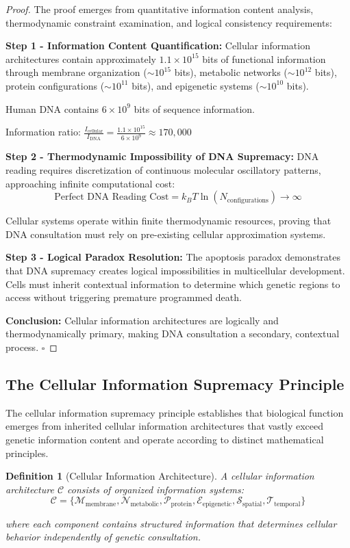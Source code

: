 \documentclass[12pt,a4paper]{article}
\newtheorem{definition}[theorem]{Definition}
\begin{document}
\begin{proof}
The proof emerges from quantitative information content analysis, thermodynamic constraint examination, and logical consistency requirements:

\textbf{Step 1 - Information Content Quantification:}
Cellular information architectures contain approximately $1.1 \times 10^{15}$ bits of functional information through membrane organization ($\sim 10^{15}$ bits), metabolic networks ($\sim 10^{12}$ bits), protein configurations ($\sim 10^{11}$ bits), and epigenetic systems ($\sim 10^{10}$ bits).

Human DNA contains $6 \times 10^9$ bits of sequence information.

Information ratio: $\frac{I_{\text{cellular}}}{I_{\text{DNA}}} = \frac{1.1 \times 10^{15}}{6 \times 10^9} \approx 170,000$

\textbf{Step 2 - Thermodynamic Impossibility of DNA Supremacy:}
DNA reading requires discretization of continuous molecular oscillatory patterns, approaching infinite computational cost:
$$\text{Perfect DNA Reading Cost} = k_B T \ln(N_{\text{configurations}}) \to \infty$$

Cellular systems operate within finite thermodynamic resources, proving that DNA consultation must rely on pre-existing cellular approximation systems.

\textbf{Step 3 - Logical Paradox Resolution:}
The apoptosis paradox demonstrates that DNA supremacy creates logical impossibilities in multicellular development. Cells must inherit contextual information to determine which genetic regions to access without triggering premature programmed death.

\textbf{Conclusion:} Cellular information architectures are logically and thermodynamically primary, making DNA consultation a secondary, contextual process. $\square$
\end{proof}

\subsection{The Cellular Information Supremacy Principle}

The cellular information supremacy principle establishes that biological function emerges from inherited cellular information architectures that vastly exceed genetic information content and operate according to distinct mathematical principles.

\begin{definition}[Cellular Information Architecture]
A cellular information architecture $\mathcal{C}$ consists of organized information systems:
$$\mathcal{C} = \{\mathcal{M}_{\text{membrane}}, \mathcal{N}_{\text{metabolic}}, \mathcal{P}_{\text{protein}}, \mathcal{E}_{\text{epigenetic}}, \mathcal{S}_{\text{spatial}}, \mathcal{T}_{\text{temporal}}\}$$

where each component contains structured information that determines cellular behavior independently of genetic consultation.
\end{definition}
\end{document}
